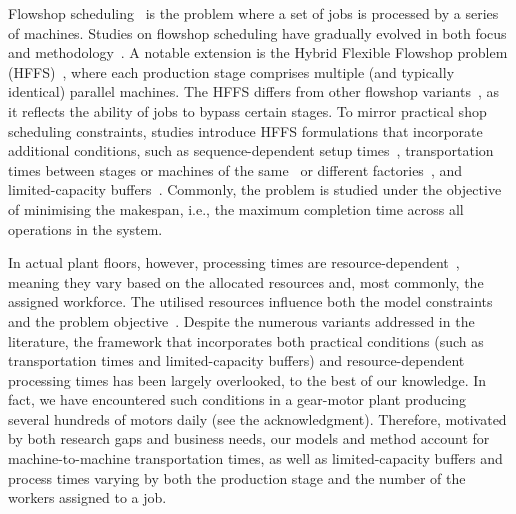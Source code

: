 \documentclass[a4paper,final]{article}
\begin{document}
Flowshop scheduling~\cite{johnson1954optimal} is the problem where a set of jobs is processed by a series of machines. Studies on flowshop scheduling have gradually evolved in both focus and methodology~\cite{gupta2006flowshop}. A notable extension is the Hybrid Flexible Flowshop problem (HFFS)~\cite{ruiz2008modeling}, where each production stage comprises multiple (and typically identical) parallel machines. The HFFS differs from other flowshop variants~\cite{ruiz2010hybrid}, as it reflects the ability of jobs to bypass certain stages. To mirror practical shop scheduling constraints, studies introduce HFFS formulations that incorporate additional conditions, such as sequence-dependent setup times~\cite{jabbarizadeh2009hybrid}, transportation times between stages or machines of the same~\cite{fernandez2025transportation} or different factories~\cite{perezgonzalez24}, and limited-capacity buffers~\cite{vatikiotis2024makespan}. Commonly, the problem is studied under the objective of minimising the makespan, i.e., the maximum completion time across all operations in the system.

In actual plant floors, however, processing times are resource-dependent~\cite{grigoriev2007machine}, meaning they vary based on the allocated resources and, most commonly, the assigned workforce. The utilised resources influence both the model constraints~\cite{behnamian2011hybrid} and the problem objective~\cite{mokhtari2011multi}. Despite the numerous variants addressed in the literature, the framework that incorporates both practical conditions (such as transportation times and limited-capacity buffers) and resource-dependent processing times has been largely overlooked, to the best of our knowledge. In fact, we have encountered such conditions in a gear-motor plant producing several hundreds of motors daily (see the acknowledgment). Therefore, motivated by both research gaps and business needs, our models and method account for machine-to-machine transportation times, as well as limited-capacity buffers and %
process times varying by both the production stage and the number of the workers assigned to a job.
    
\end{document}
